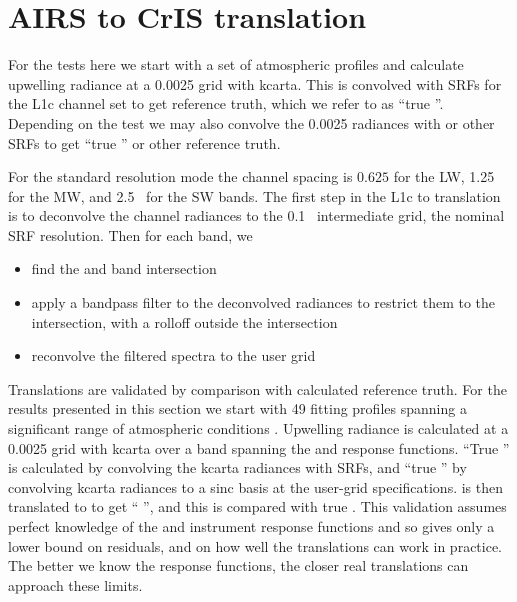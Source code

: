 \documentclass[11pt]{article}
\begin{document}
\FloatBarrier
\section{AIRS to CrIS translation}
\label{airs2cris}


For the tests here we start with a set of atmospheric profiles and
calculate upwelling radiance at a 0.0025 {\wn} grid with kcarta.
This is convolved with SRFs for the {\airs} L1c channel set to get
{\airs} reference truth, which we refer to as ``true {\airs}''.
Depending on the test we may also convolve the 0.0025 {\wn}
radiances with {\cris} or other SRFs to get ``true {\cris}'' or
other reference truth.  

For the {\cris} standard resolution mode the channel spacing is
$0.625$ {\wn} for the LW, 1.25~{\wn} for the MW, and 2.5~{\wn} for
the SW bands.  The first step in the {\airs} L1c to {\cris}
translation is to deconvolve the {\airs} channel radiances to the
0.1~{\wn} intermediate grid, the nominal {\airs} SRF resolution.
Then for each {\cris} band, we

\begin{itemize}
  \item find the {\airs} and {\cris} band intersection

  \item apply a bandpass filter to the deconvolved {\airs} radiances
    to restrict them to the intersection, with a rolloff outside the
    intersection

  \item reconvolve the filtered spectra to the {\cris} user grid

\end{itemize}

Translations are validated by comparison with calculated reference
truth.  For the results presented in this section we start with 49
fitting profiles spanning a significant range of atmospheric
conditions \cite{sarta1,sarta2}.  Upwelling radiance is calculated
at a 0.0025 {\wn} grid with kcarta \cite{kcarta1} over a band
spanning the {\airs} and {\cris} response functions.  ``True
{\airs}'' is calculated by convolving the kcarta radiances with
{\airs} SRFs, and ``true {\cris}'' by convolving kcarta radiances to
a sinc basis at the {\cris} user-grid specifications.  {\airs} is
then translated to {\cris} to get ``{\airs} {\cris}'', and this is
compared with true {\cris}.  This validation assumes perfect
knowledge of the {\airs} and {\cris} instrument response functions
and so gives only a lower bound on residuals, and on how well the
translations can work in practice.  The better we know the response
functions, the closer real translations can approach these limits.
\end{document}
